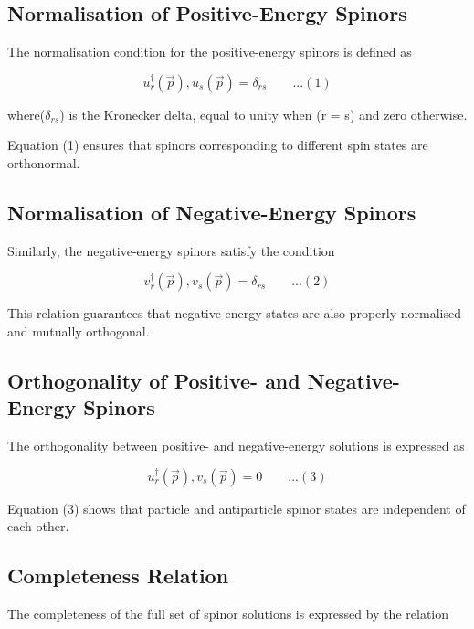 \documentclass[12pt]{report}
\begin{document}
\subsection*{Normalisation of Positive-Energy Spinors}

The normalisation condition for the positive-energy spinors is defined as

\begin{equation*}
u_r^\dagger(\vec{p}), u_s(\vec{p}) = \delta_{rs}\qquad ...(1)
\end{equation*}

where($\delta_{rs}$) is the Kronecker delta, equal to unity when (r = s) and zero otherwise.

Equation (1) ensures that spinors corresponding to different spin states are orthonormal.

\subsection*{Normalisation of Negative-Energy Spinors}

Similarly, the negative-energy spinors satisfy the condition

\begin{equation*}
v_r^\dagger(\vec{p}), v_s(\vec{p}) = \delta_{rs}\qquad ...(2)
\end{equation*}

This relation guarantees that negative-energy states are also properly normalised and mutually orthogonal.

\subsection*{Orthogonality of Positive- and Negative-Energy Spinors}

The orthogonality between positive- and negative-energy solutions is expressed as

\begin{equation*}
u_r^\dagger(\vec{p}), v_s(\vec{p}) = 0\qquad ...(3)
\end{equation*}

Equation (3) shows that particle and antiparticle spinor states are independent of each other.

\subsection*{Completeness Relation}

The completeness of the full set of spinor solutions is expressed by the relation
\end{document}
